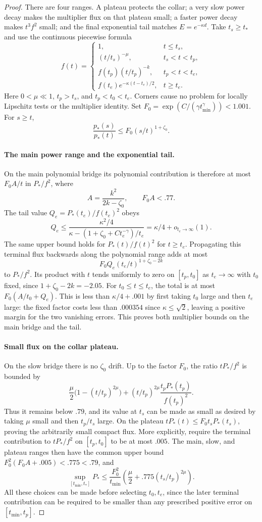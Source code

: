 \begin{proof}
There are four ranges.  A plateau protects the collar; a very slow
power decay makes the multiplier flux on that plateau small; a faster
power decay makes $t^3f^2$ small; and the final exponential tail matches
$E=e^{-\kappa d}$.  Take $t_s\ge t_*$ and use the continuous piecewise
formula
\[
 f(t)=
 \begin{cases}
 1,&t\le t_s,\\
 (t/t_s)^{-\mu},&t_s<t<t_p,\\
 f(t_p)(t/t_p)^{-k},&t_p<t<t_e,\\
 f(t_e)e^{-\kappa(t-t_e)/2},&t\ge t_e.
 \end{cases}
\]
Here $0<\mu\ll1$, $t_p>t_s$, and $t_p<t_0<t_e$.  Corners cause no
problem for locally Lipschitz tests or the multiplier identity.
Set $F_0=\exp(C/(\gamma t_{\min}^{\gamma}))<1.001$.
For $s\ge t$,
\[
 \frac{p_*(s)}{p_*(t)}
 \le F_0(s/t)^{1+\zeta_0}.
\]
\paragraph{The main power range and the exponential tail.}
On the main polynomial bridge its polynomial contribution is therefore
at most $F_0 A/t$ in $P_*/f^2$, where
\[
 A=\frac{k^2}{2k-\zeta_0},\qquad F_0A<.77.
\]
The tail value $Q_e=P_*(t_e)/f(t_e)^2$ obeys
\[
 Q_e\le
 \frac{\kappa^2/4}
 {\kappa-(1+\zeta_0+Ct_e^{-\gamma})/t_e}
 =\kappa/4+o_{t_e\to\infty}(1).
\]
The same upper bound holds for $P_*(t)/f(t)^2$ for $t\ge t_e$.
Propagating this terminal flux backwards along the polynomial range
adds at most
\[
 F_0Q_e(t_e/t)^{1+\zeta_0-2k}
\]
to $P_*/f^2$.  Its product with $t$ tends uniformly to zero on
$[t_p,t_0]$ as $t_e\to\infty$ with $t_0$ fixed, since
$1+\zeta_0-2k=-2.05$.
For $t_0\le t\le t_e$, the total is at most
$F_0(A/t_0+Q_e)$.  This is less than $\kappa/4+.001$ by first taking
$t_0$ large and then $t_e$ large: the fixed factor costs less than
$.000354$ since $\kappa\le\sqrt2$, leaving a positive margin for the
two vanishing errors.  This proves both multiplier bounds on the main
bridge and the tail.

\paragraph{Small flux on the collar plateau.}
On the slow bridge there is no $\zeta_0$ drift.  Up to the factor
$F_0$, the ratio $tP_*/f^2$ is bounded by
\[
 \frac\mu2\bigl(1-(t/t_p)^{2\mu}\bigr)
 +(t/t_p)^{2\mu}\frac{t_pP_*(t_p)}{f(t_p)^2}.
\]
Thus it remains below $.79$, and its value at $t_s$ can be made as
small as desired by taking $\mu$ small and then $t_p/t_s$ large.
On the plateau $tP_*(t)\le F_0 t_sP_*(t_s)$, proving the arbitrarily
small compact flux.  More explicitly, require the terminal contribution
to $tP_*/f^2$ on $[t_p,t_0]$ to be at most $.005$.  The main, slow,
and plateau ranges then have the common upper bound
$F_0^2(F_0A+.005)<.775<.79$, and
\[
 \sup_{[t_{\min},t_*]}P_*
 \le \frac{F_0^2}{t_{\min}}
       \left(\frac\mu2+.775(t_s/t_p)^{2\mu}\right).
\]
All these choices can be made before selecting
$t_0,t_e$, since the later terminal contribution can be required to be
smaller than any prescribed positive error on $[t_{\min},t_p]$.


\end{proof}
